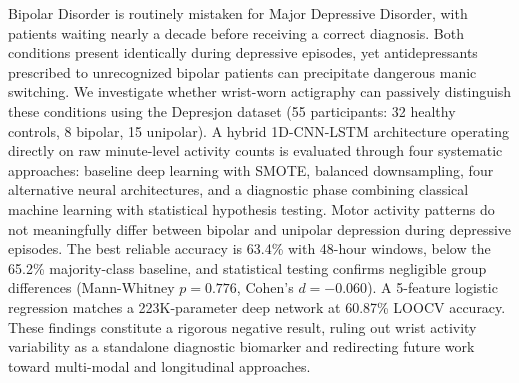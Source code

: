 Bipolar Disorder is routinely mistaken for Major Depressive Disorder, with patients waiting nearly a decade before receiving a correct diagnosis. Both conditions present identically during depressive episodes, yet antidepressants prescribed to unrecognized bipolar patients can precipitate dangerous manic switching. We investigate whether wrist-worn actigraphy can passively distinguish these conditions using the Depresjon dataset (55 participants: 32 healthy controls, 8 bipolar, 15 unipolar). A hybrid 1D-CNN-LSTM architecture operating directly on raw minute-level activity counts is evaluated through four systematic approaches: baseline deep learning with SMOTE, balanced downsampling, four alternative neural architectures, and a diagnostic phase combining classical machine learning with statistical hypothesis testing. Motor activity patterns do not meaningfully differ between bipolar and unipolar depression during depressive episodes. The best reliable accuracy is 63.4\% with 48-hour windows, below the 65.2\% majority-class baseline, and statistical testing confirms negligible group differences (Mann-Whitney $p = 0.776$, Cohen's $d = {-}0.060$). A 5-feature logistic regression matches a 223K-parameter deep network at 60.87\% LOOCV accuracy. These findings constitute a rigorous negative result, ruling out wrist activity variability as a standalone diagnostic biomarker and redirecting future work toward multi-modal and longitudinal approaches.
